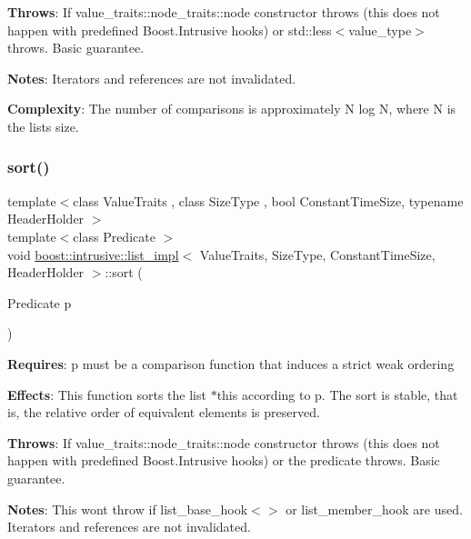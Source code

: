 {\bfseries Throws}\+: If value\+\_\+traits\+::node\+\_\+traits\+::node constructor throws (this does not happen with predefined Boost.\+Intrusive hooks) or std\+::less$<$value\+\_\+type$>$ throws. Basic guarantee.

{\bfseries Notes}\+: Iterators and references are not invalidated.

{\bfseries Complexity}\+: The number of comparisons is approximately N log N, where N is the list\textquotesingle{}s size. \mbox{\label{classboost_1_1intrusive_1_1list__impl_a76891ada0d200ee89011b08ce5d548c0}} 
\subsubsection{\texorpdfstring{sort()}{sort()}\hspace{0.1cm}{\footnotesize\ttfamily [2/2]}}
{\footnotesize\ttfamily template$<$class Value\+Traits , class Size\+Type , bool Constant\+Time\+Size, typename Header\+Holder $>$ \\
template$<$class Predicate $>$ \\
void \hyperlink{classboost_1_1intrusive_1_1list__impl}{boost\+::intrusive\+::list\+\_\+impl}$<$ Value\+Traits, Size\+Type, Constant\+Time\+Size, Header\+Holder $>$\+::sort (\begin{DoxyParamCaption}\item[{Predicate}]{p }\end{DoxyParamCaption})\hspace{0.3cm}{\ttfamily [inline]}}

{\bfseries Requires}\+: p must be a comparison function that induces a strict weak ordering

{\bfseries Effects}\+: This function sorts the list $\ast$this according to p. The sort is stable, that is, the relative order of equivalent elements is preserved.

{\bfseries Throws}\+: If value\+\_\+traits\+::node\+\_\+traits\+::node constructor throws (this does not happen with predefined Boost.\+Intrusive hooks) or the predicate throws. Basic guarantee.

{\bfseries Notes}\+: This won\textquotesingle{}t throw if list\+\_\+base\+\_\+hook$<$$>$ or list\+\_\+member\+\_\+hook are used. Iterators and references are not invalidated.

